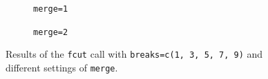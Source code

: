 \documentclass[review]{elsarticle}
\newcommand{\code}[1]{\texttt{#1}}
\begin{document}
\begin{figure}[h]
    \centering
    \newsavebox{\largestimage}
    \begin{subfigure}[b]{0.49\textwidth}
        \centering
        \usebox{\largestimage}
        \caption{\code{merge=1}}
    \end{subfigure}
    \begin{subfigure}[b]{0.49\textwidth}
        \centering
        \caption{\code{merge=2}}
    \end{subfigure}
    \caption{Results of the \code{fcut} call with \code{breaks=c(1, 3, 5, 7, 9)} and different settings of \code{merge}.}
    \label{fig:fcut}
\end{figure}
\end{document}
